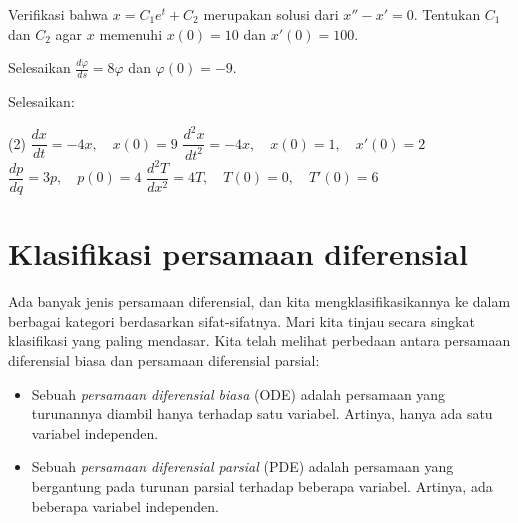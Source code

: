 \begin{exercise}
Verifikasi bahwa $x=C_1e^t+C_2$ merupakan solusi dari $x''-x' = 0$. Tentukan $C_1$ dan
$C_2$ agar $x$ memenuhi $x(0) = 10$ dan $x'(0) = 100$.
\end{exercise}

\begin{exercise}
Selesaikan $\frac{d\varphi}{ds} = 8 \varphi$ dan $\varphi(0) = -9$.
\end{exercise}

\begin{exercise}
Selesaikan:
\begin{tasks}(2)
\task $\dfrac{dx}{dt} = -4x, \quad x(0)=9$
\task $\dfrac{d^2x}{dt^2} = -4x, \quad x(0)=1, \quad x'(0)=2$
\task $\dfrac{dp}{dq} = 3 p, \quad p(0)=4$
\task $\dfrac{d^2T}{dx^2} = 4 T, \quad T(0)=0, \quad T'(0)=6$
\end{tasks}
\end{exercise}


\sectionnewpage
\section{Klasifikasi persamaan diferensial}
\label{classification:section}


Ada banyak jenis persamaan diferensial, dan kita mengklasifikasikannya ke dalam
berbagai kategori berdasarkan sifat-sifatnya. Mari kita tinjau secara singkat
klasifikasi yang paling mendasar. Kita telah melihat perbedaan antara
persamaan diferensial biasa dan persamaan diferensial parsial:
\begin{itemize}
\item
Sebuah \emph{persamaan diferensial biasa}
(ODE) adalah persamaan yang turunannya diambil hanya terhadap satu variabel.
Artinya, hanya ada satu variabel independen.
\item
Sebuah \emph{persamaan diferensial parsial}
(PDE) adalah persamaan yang bergantung pada turunan parsial terhadap beberapa variabel.
Artinya, ada beberapa variabel independen.
\end{itemize}

